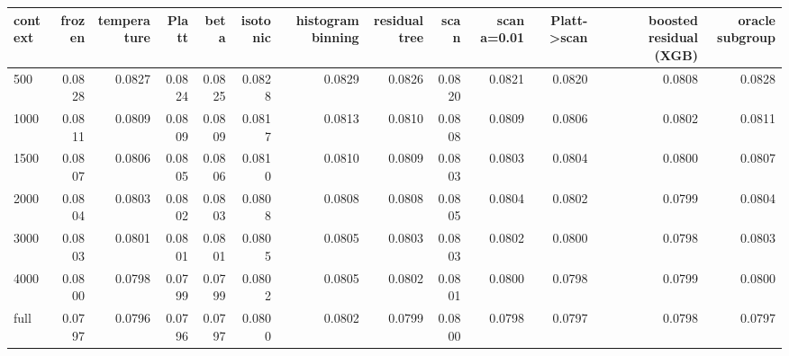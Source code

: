 \begin{tabular}{lrrrrrrrrrrrr}
\toprule
context & frozen & temperature & Platt & beta & isotonic & histogram binning & residual tree & scan & scan a=0.01 & Platt->scan & boosted residual (XGB) & oracle subgroup \\
\midrule
500 & 0.0828 & 0.0827 & 0.0824 & 0.0825 & 0.0828 & 0.0829 & 0.0826 & 0.0820 & 0.0821 & 0.0820 & 0.0808 & 0.0828 \\
1000 & 0.0811 & 0.0809 & 0.0809 & 0.0809 & 0.0817 & 0.0813 & 0.0810 & 0.0808 & 0.0809 & 0.0806 & 0.0802 & 0.0811 \\
1500 & 0.0807 & 0.0806 & 0.0805 & 0.0806 & 0.0810 & 0.0810 & 0.0809 & 0.0803 & 0.0803 & 0.0804 & 0.0800 & 0.0807 \\
2000 & 0.0804 & 0.0803 & 0.0802 & 0.0803 & 0.0808 & 0.0808 & 0.0808 & 0.0805 & 0.0804 & 0.0802 & 0.0799 & 0.0804 \\
3000 & 0.0803 & 0.0801 & 0.0801 & 0.0801 & 0.0805 & 0.0805 & 0.0803 & 0.0803 & 0.0802 & 0.0800 & 0.0798 & 0.0803 \\
4000 & 0.0800 & 0.0798 & 0.0799 & 0.0799 & 0.0802 & 0.0805 & 0.0802 & 0.0801 & 0.0800 & 0.0798 & 0.0799 & 0.0800 \\
full & 0.0797 & 0.0796 & 0.0796 & 0.0797 & 0.0800 & 0.0802 & 0.0799 & 0.0800 & 0.0798 & 0.0797 & 0.0798 & 0.0797 \\
\bottomrule
\end{tabular}

